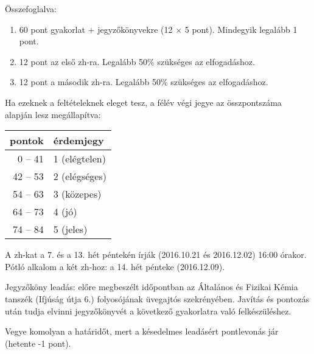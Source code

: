\documentclass{article}
\begin{document}
Összefoglalva:

\begin{enumerate}
\item 60 pont gyakorlat + jegyzőkönyvekre (12 $\times$ 5 pont).  Mindegyik legalább 1 pont.
\item 12 pont az első zh-ra. Legalább 50\% szükséges az elfogadáshoz.
\item 12 pont a második zh-ra. Legalább 50\% szükséges az elfogadáshoz. 
\end{enumerate}

Ha ezeknek a feltételeknek eleget tesz, a félév végi jegye az összpontszáma alapján lesz megállapítva:

\begin{center}
\begin{tabular}{|r|l|}
\hline
pontok & érdemjegy \\
\hline
0 -- 41 & 1 (elégtelen) \\
\hline
42 -- 53 & 2 (elégséges) \\
\hline
54 -- 63 & 3 (közepes) \\
\hline
64 -- 73 & 4 (jó) \\
\hline
74 -- 84 & 5 (jeles) \\
\hline
\end{tabular}
\end{center}

A zh-kat a 7. és a 13. hét péntekén írják (2016.10.21 és 2016.12.02) 16:00 órakor. Pótló alkalom a két zh-hoz: a 14. hét pénteke (2016.12.09).

Jegyzőköny leadás: előre megbeszélt időpontban az Általános és Fizikai Kémia tanszék (Ifjúság útja 6.) folyosójának üvegajtós szekrényében. Javítás és pontozás után tudja elvinni jegyzőkönyvét a következő gyakorlatra való felkészüléshez.

Vegye komolyan a határidőt, mert a késedelmes leadásért pontlevonás jár (hetente -1 pont).
\end{document}
